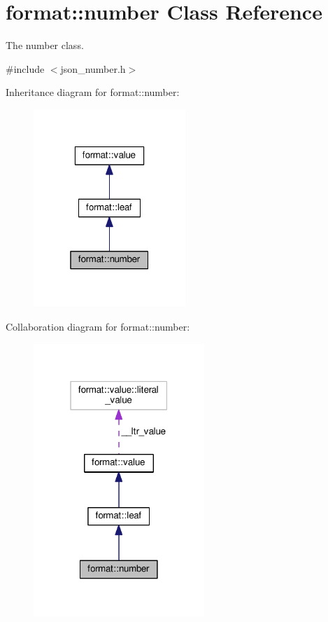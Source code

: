 \hypertarget{classformat_1_1number}{}\section{format\+:\+:number Class Reference}
\label{classformat_1_1number}


The number class.  




{\ttfamily \#include $<$json\+\_\+number.\+h$>$}



Inheritance diagram for format\+:\+:number\+:
\nopagebreak
\begin{figure}[H]
\begin{center}
\leavevmode
\includegraphics[width=163pt]{classformat_1_1number__inherit__graph}
\end{center}
\end{figure}


Collaboration diagram for format\+:\+:number\+:
\nopagebreak
\begin{figure}[H]
\begin{center}
\leavevmode
\includegraphics[width=183pt]{classformat_1_1number__coll__graph}
\end{center}
\end{figure}
